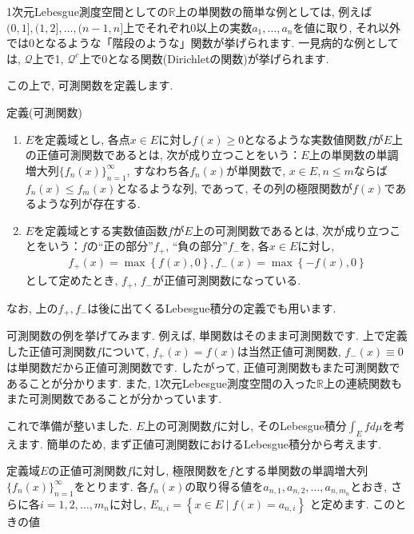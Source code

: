 \par 1次元Lebesgue測度空間としての$\mathbb{R}$上の単関数の簡単な例としては, 例えば$(0,1],(1,2],\ldots,(n-1,n]$上でそれぞれ0以上の実数$a_1,\ldots,a_n$を値に取り, それ以外では0となるような「階段のような」関数が挙げられます. 一見病的な例としては, $\mathcal{Q}$上で1, $\mathcal{Q}^c$上で0となる関数(Dirichletの関数)が挙げられます. 
\par この上で, 可測関数を定義します. 
\begin{itembox}[l]{定義(可測関数)}
\begin{enumerate}
\item $E$を定義域とし, 各点$x\in E$に対し$f(x)\ge 0$となるような実数値関数$f$が$E$上の正値可測関数であるとは, 次が成り立つことをいう：$E$上の単関数の単調増大列$\{f_n(x)\}_{n=1}^{\infty}$, すなわち各$f_n(x)$が単関数で, $x\in E, n\le m$ならば$f_{n}(x) \le f_{m}(x)$となるような列, であって, その列の極限関数が$f(x)$であるような列が存在する. 
\item $E$を定義域とする実数値函数$f$が$E$上の可測関数であるとは, 次が成り立つことをいう：$f$の“正の部分”$f_{+}$, “負の部分”$f_{-}$を, 各$x\in E$に対し, 
\begin{eqnarray}
f_{+}(x)=\max \left\{f(x),0\right\} , f_{-}(x)=\max \left\{-f(x),0\right\} \nonumber
\end{eqnarray}
として定めたとき, $f_{+}$, $f_{-}$が正値可測関数になっている. 
\end{enumerate}
\end{itembox}
\par なお, 上の$f_{+}, f_{-}$は後に出てくるLebesgue積分の定義でも用います. 
\par 可測関数の例を挙げてみます. 例えば, 単関数はそのまま可測関数です. 上で定義した正値可測関数$f$について, $f_{+}(x)=f(x)$は当然正値可測関数, $f_{-}(x)\equiv 0$は単関数だから正値可測関数です. したがって, 正値可測関数もまた可測関数であることが分かります. また, 1次元Lebesgue測度空間の入った$\mathbb{R}$上の連続関数もまた可測関数であることが分かっています. 
\par これで準備が整いました. $E$上の可測関数$f$に対し, そのLebesgue積分$\displaystyle \int_{E}fd\mu$を考えます. 簡単のため, まず正値可測関数におけるLebesgue積分から考えます. 
\par 定義域$E$の正値可測関数$f$に対し, 極限関数を$f$とする単関数の単調増大列$\{f_{n}(x)\}_{n=1}^{\infty}$をとります. 各$f_{n}(x)$の取り得る値を$a_{n,1},a_{n,2},\ldots,a_{n,m_{n}}$とおき, さらに各$i=1,2,\ldots,m_{n}$に対し, $\displaystyle E_{n,i}=\left\{x\in E \mid f(x)=a_{n,i}\right\}$ と定めます. このときの値
